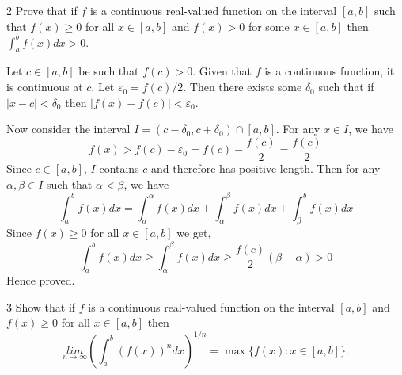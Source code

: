 \documentclass[12pt]{article}
\begin{document}
\newpage 

\begin{problem}{2}
     Prove that if $f$ is a continuous real-valued function on the interval $[a, b]$ such that $f(x) \geq 0$ for all $x \in [a,b]$  and $f(x) > 0$ for some $x \in [a,b]$ then $\int_a^bf(x)dx > 0$. 
\end{problem}

\begin{solution}
    \bbni
    
    Let $c \in [a,b]$ be such that $f(c) >0$. Given that $f$ is a continuous function, it is continuous at $c$. Let $\varepsilon_0 = f(c)/2$. Then there exists some $\delta_0$ such that if $|x - c| < \delta_0$ then $|f(x) - f(c)| < \varepsilon_0$.

    Now consider the interval $I = (c - \delta_0, c + \delta_0) \cap [a,b]$. For any $x \in I$, we have 
    \[f(x) > f(c) - \varepsilon_0 = f(c) - \frac{f(c)}{2} = \frac{f(c)}{2}\]
    Since $c \in [a,b]$, $I$ contains $c$ and therefore has positive length. Then for any $\alpha, \beta \in I$ such that $\alpha < \beta$, we have 
    \[\int_a^b f(x)dx = \int_a^\alpha f(x)dx  + \int_\alpha^\beta f(x)dx  + \int_\beta^b f(x)dx\]
    Since $f(x) \geq 0$ for all $x \in [a,b]$ we get, 
    \[\int_a^b f(x)dx \geq \int_\alpha^\beta f(x) dx \geq \frac{f(c)}{2}(\beta - \alpha) > 0\]
    Hence proved. 
\end{solution}

\newpage

\begin{problem}{3}
    Show that if $f$ is a continuous real-valued function on the interval $[a,b]$ and $f(x) \geq 0$ for all $x \in [a,b]$ then 
    \[\underset{n \to \infty}{lim} \left(\int_a^b \left( f(x)\right)^n dx\right)^{1/n} = \max \{f(x): x \in [a,b]\}.\]
\end{problem}
\end{document}
